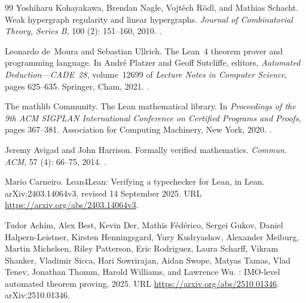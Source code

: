 \documentclass[a4paper,11pt,reqno]{amsart}
\theoremstyle{plain}
\theoremstyle{definition}
\theoremstyle{remark}
\begin{document}
\begin{thebibliography}{99}
Yoshiharu Kohayakawa, Brendan Nagle, Vojt\v{e}ch R{\"o}dl, and Mathias Schacht.
\newblock Weak hypergraph regularity and linear hypergraphs.
\newblock \emph{Journal of Combinatorial Theory, Series B},
  100 (2): 151--160, 2010.
\newblock {}.

Leonardo de~Moura and Sebastian Ullrich.
\newblock The Lean~4 theorem prover and programming language.
\newblock In Andr\'e Platzer and Geoff Sutcliffe, editors,
  \emph{Automated Deduction---CADE~28}, volume~12699 of \emph{Lecture
  Notes in Computer Science}, pages 625--635. Springer, Cham, 2021.
\newblock {}.

The mathlib Community.
\newblock The Lean mathematical library.
\newblock In \emph{Proceedings of the 9th ACM SIGPLAN International
  Conference on Certified Programs and Proofs}, pages 367--381.
  Association for Computing Machinery, New York, 2020.
\newblock {}.

Jeremy Avigad and John Harrison.
\newblock Formally verified mathematics.
\newblock \emph{Commun. ACM}, 57 (4): 66--75, 2014.
\newblock {}.

Mario Carneiro.
\newblock Lean4Lean: Verifying a typechecker for Lean, in Lean.
\newblock arXiv:2403.14064v3, revised 14 September 2025.
\newblock URL \url{https://arxiv.org/abs/2403.14064v3}.

Tudor Achim, Alex Best, Kevin Der, Math{\"i}s F{\'e}d{\'e}rico, Sergei Gukov,
  Daniel Halpern-Leistner, Kirsten Henningsgard, Yury Kudryashov, Alexander
  Meiburg, Martin Michelsen, Riley Patterson, Eric Rodriguez, Laura Scharff,
  Vikram Shanker, Vladimir Sicca, Hari Sowrirajan, Aidan Swope, Matyas Tamas,
  Vlad Tenev, Jonathan Thomm, Harold Williams, and Lawrence Wu.
: {IMO}-level automated theorem proving, 2025.
\newblock URL \url{https://arxiv.org/abs/2510.01346}.
\newblock arXiv:2510.01346.

\end{thebibliography}
\end{document}
